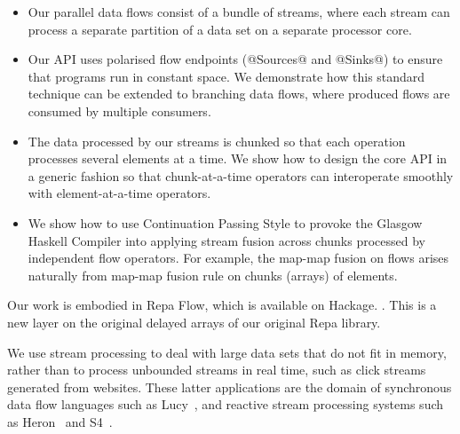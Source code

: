 \begin{itemize}
\item Our parallel data flows consist of a bundle of streams, where each stream can process a separate partition of a data set on a separate processor core.

\item Our API uses polarised flow endpoints (@Sources@ and @Sinks@) to ensure that programs run in constant space. We demonstrate how this standard technique can be extended to branching data flows, where produced flows are consumed by multiple consumers.

\item The data processed by our streams is chunked so that each operation processes several elements at a time. We show how to design the core API in a generic fashion so that chunk-at-a-time operators can interoperate smoothly with element-at-a-time operators.

\item We show how to use Continuation Passing Style to provoke the Glasgow Haskell Compiler into applying stream fusion across chunks processed by independent flow operators. For example, the map-map fusion on flows arises naturally from map-map fusion rule on chunks (arrays) of elements.
\end{itemize}

Our work is embodied in Repa Flow, which is available on Hackage.  \cite{Lippmeier:Guiding, Lippmeier:DataFlow}. This is a new layer on the original delayed arrays of our original Repa library.

We use stream processing to deal with large data sets that do not fit in memory,
rather than to process unbounded streams in real time, such as click streams generated from websites. These latter applications are the domain of synchronous data flow languages such as Lucy~\cite{Mandel:Lucy}, and reactive stream processing systems such as Heron~\cite{Kulkarn:Heron} and S4~\cite{Neumeyer:S4}.


